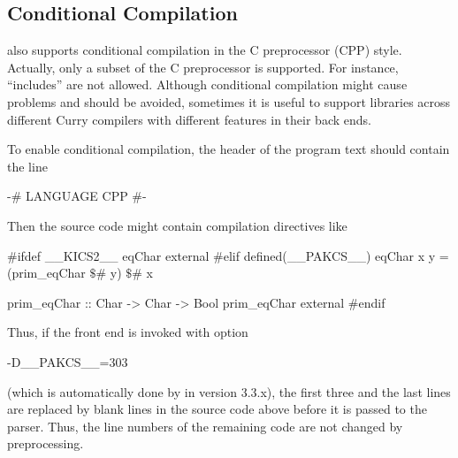 \subsection{Conditional Compilation}

\CYS also supports conditional compilation in the C preprocessor (CPP) style.
Actually, only a subset of the C preprocessor is supported.
For instance, ``includes'' are not allowed.
Although conditional compilation might cause problems
and should be avoided, sometimes it is useful to support libraries
across different Curry compilers with different features
in their back ends.

To enable conditional compilation, the header of the program text
should contain the line
%
\begin{curry}
{-# LANGUAGE CPP #-}
\end{curry}
%
Then the source code might contain compilation directives like
%
\begin{curry}
#ifdef __KICS2__
eqChar external
#elif defined(__PAKCS__)
eqChar x y = (prim_eqChar $\$$# y) $\$$# x

prim_eqChar :: Char -> Char -> Bool
prim_eqChar external
#endif
\end{curry}
%
Thus, if the front end is invoked with option
\begin{curry}
-D__PAKCS__=303
\end{curry}
(which is automatically done by \CYS in version 3.3.x),
the first three and the last lines are replaced by blank lines
in the source code above before it is passed to the parser.
Thus, the line numbers of the remaining code are not changed
by preprocessing.


